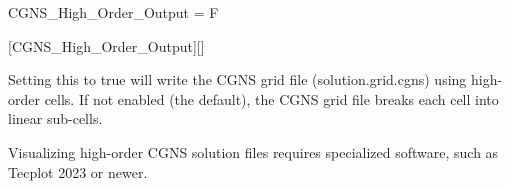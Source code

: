 %
%
%
%


\begin{nmldescitem}
CGNS_High_Order_Output = F
\end{nmldescitem}
[CGNS\_High\_Order\_Output][]

\begin{nmldescbody}
Setting this to true will write the CGNS grid file (solution.grid.cgns)
using high-order cells. If not enabled (the default), the CGNS grid file
breaks each cell into linear sub-cells.

\NOTE
Visualizing high-order CGNS solution files requires specialized software,
such as Tecplot 2023 or newer.
\end{nmldescbody}


